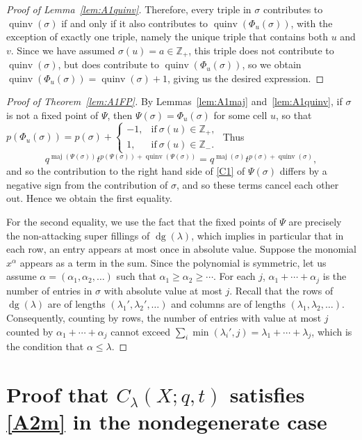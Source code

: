 \documentclass[ALCO,Unicode]{cedram}
\DeclareMathOperator{\dg}{dg}
\DeclareMathOperator{\maj}{maj}
\DeclareMathOperator{\quinv}{quinv}
\begin{document}
\begin{proof}[Proof of Lemma~\ref{lem:A1quinv}]
Therefore, every triple in $\sigma$ contributes to $\quinv(\sigma)$ if and only if it also contributes to $\quinv(\Phi_u(\sigma))$, with the exception of exactly one triple, namely the unique triple that contains both $u$ and $v$. Since we have assumed $\sigma(u)=a\in\mathbb{Z}_+$, this triple does not contribute to $\quinv(\sigma)$, but does contribute to $\quinv(\Phi_u(\sigma))$, so we obtain $\quinv(\Phi_u(\sigma))=\quinv(\sigma)+1$, giving us the desired expression.
\end{proof}

\begin{proof}[Proof of Theorem~\ref{lem:A1FP}]
By Lemmas~\ref{lem:A1maj} and~\ref{lem:A1quinv}, if $\sigma$ is not a fixed point of $\Psi$, then $\Psi(\sigma)=\Phi_u(\sigma)$ for some cell $u$, so that $p(\Phi_u(\sigma)) = p(\sigma)+\begin{cases}-1, & \mbox{if}\ \sigma(u)\in\mathbb{Z}_+,\\1, & \mbox{if}\ \sigma(u)\in\mathbb{Z}_-.\end{cases}$ Thus 
\[
q^{\maj(\Psi(\sigma))}t^{p(\Psi(\sigma))+\quinv(\Psi(\sigma))} = q^{\maj(\sigma)}t^{p(\sigma)+\quinv(\sigma)},
\] 
and so the contribution to the right hand side of \eqref{C1} of $\Psi(\sigma)$ differs by a negative sign from the contribution of $\sigma$, and so these terms cancel each other out. Hence we obtain the first equality.

For the second equality, we use the fact that the fixed points of $\Psi$ are precisely the non-attacking super fillings of $\dg(\lambda)$, which implies in particular that in each row, an entry appears at most once in absolute value. Suppose the monomial $x^{\alpha}$ appears as a term in the sum. Since the polynomial is symmetric, let us assume $\alpha=(\alpha_1,\alpha_2,\ldots)$ such that $\alpha_1\geq \alpha_2 \geq \cdots$. For each $j$, $\alpha_1+\cdots+\alpha_j$ is the number of entries in $\sigma$ with absolute value at most $j$. Recall that the rows of $\dg(\lambda)$ are of lengths $(\lambda_1',\lambda_2',\ldots)$ and columns are of lengths $(\lambda_1,\lambda_2,\ldots)$. Consequently, counting by rows, the number of entries with value at most $j$ counted by $\alpha_1+\cdots+\alpha_j$ cannot exceed $\sum_i \min(\lambda_i',j) = \lambda_1+\cdots+\lambda_j$, which is the condition that $\alpha \leq \lambda$. 
\end{proof}

\section{Proof that $C_{\lambda}(X;q,t)$ satisfies \eqref{A2m} in the nondegenerate case}
\label{sec:A2m}
\end{document}
